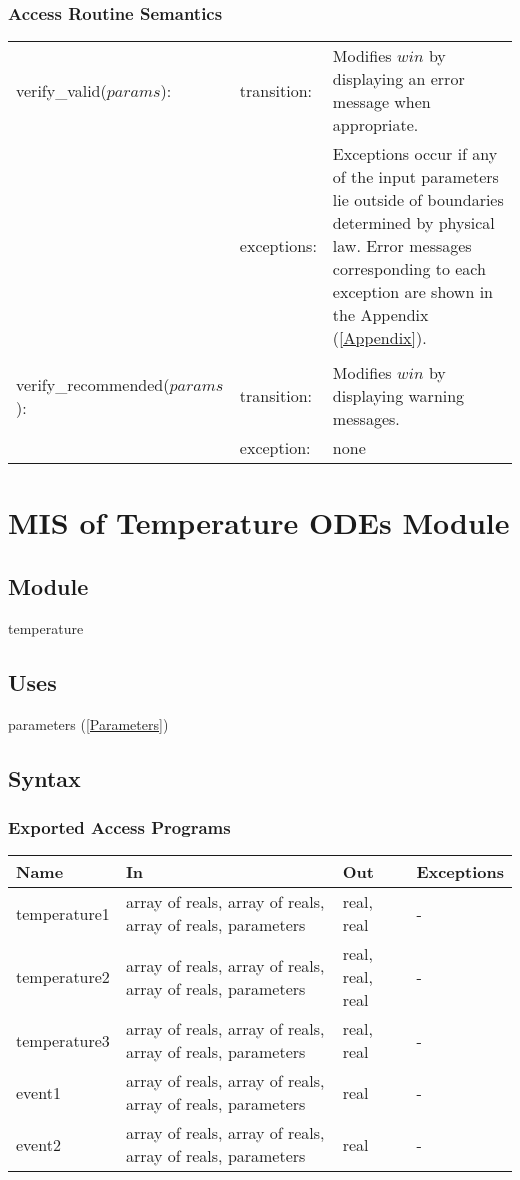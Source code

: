 \documentclass[12pt]{article}
\begin{document}
\subsubsection{Access Routine Semantics}
\begin{center}
\begin{tabular}{l l p{8cm}}
verify\_valid($params$): & transition: & Modifies $win$ by displaying an error message when appropriate. \\
& exceptions: & Exceptions occur if any of the input parameters lie outside of boundaries determined by physical law. Error messages corresponding to each exception are shown in the Appendix (\ref{Appendix}). \\ \\
verify\_recommended($params$): & transition: & Modifies $win$ by displaying warning messages. \\
& exception: & none
\end{tabular}
\end{center}

\section{MIS of Temperature ODEs Module} \label{Temperature}
\subsection{Module}
temperature
\subsection{Uses}
parameters (\ref{Parameters})
\subsection{Syntax}
\subsubsection{Exported Access Programs}
\begin{center}
\begin{tabular}{p{3cm} p{7cm} p{2cm} p{2cm}}
\hline
\textbf{Name} & \textbf{In} & \textbf{Out} & \textbf{Exceptions} \\
\hline
temperature1 & array of reals, array of reals, array of reals, parameters & real, real & - \\
\hline
temperature2 & array of reals, array of reals, array of reals, parameters & real, real, real & - \\
\hline
temperature3 & array of reals, array of reals, array of reals, parameters & real, real & - \\
\hline
event1 & array of reals, array of reals, array of reals, parameters & real & - \\
\hline
event2 & array of reals, array of reals, array of reals, parameters & real & - \\
\hline
\end{tabular}
\end{center}
\end{document}
